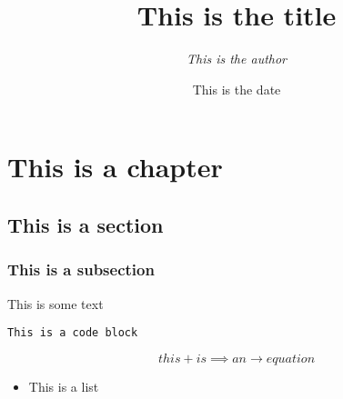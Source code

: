 \documentclass[11pt,twoside,titlepage,a4paper]{report}
\begin{document}
\title{\Huge{\textbf{This is the title}}}
\author{\textit{This is the author}}
\date{This is the date}
\maketitle

\tableofcontents
\clearpage


\chapter{This is a chapter}

\section{This is a section}

\subsection{This is a subsection}

This is some text

\begin{lstlisting}
This is a code block
\end{lstlisting}

\begin{equation*}
this+is\implies an\to equation
\end{equation*}

\begin{itemize}
\item This is a list
\end{itemize}
\end{document}
